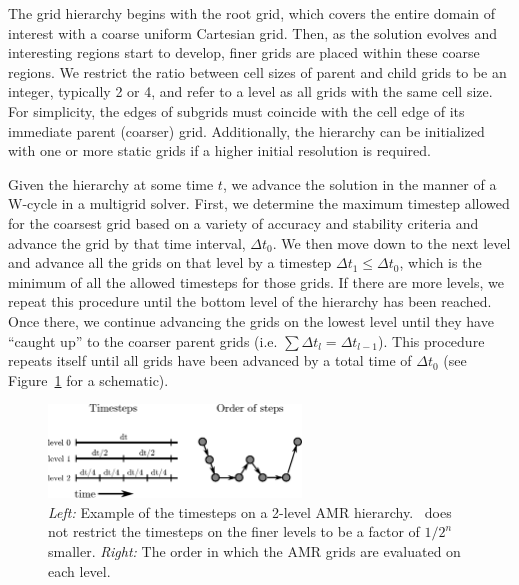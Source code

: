 The grid hierarchy begins with the root grid, which covers the entire
domain of interest with a coarse uniform Cartesian grid. Then, as
the solution evolves and interesting regions start to develop, finer grids are
placed within these coarse regions.
We restrict the ratio between cell sizes of parent and child grids to be an integer, typically 2
or 4, and refer to a level as all grids with the same cell size.  For simplicity, the edges of subgrids must
coincide with the cell edge of its immediate parent (coarser)
grid. Additionally, the hierarchy can be initialized with one or more
static grids if a higher initial resolution is required.

Given the hierarchy at some time $t$, we advance the solution in the
manner of a W-cycle in a multigrid solver.  First, we determine the
maximum timestep allowed for the coarsest grid based on a variety of
accuracy and stability criteria and advance the grid by that time
interval, $\Delta t_0$.  We then move down to the next level and
advance all the grids on that level by a timestep $\Delta t_1 \leq
\Delta t_0$, which is the minimum of all the allowed timesteps for
those grids.  If there are more levels, we repeat this procedure until
the bottom level of the hierarchy has been reached.  Once there, we
continue advancing the grids on the lowest level until they have
``caught up'' to the coarser parent grids (i.e. $\sum \Delta t_l =
\Delta t_{l-1}$).  This procedure repeats itself until all grids have
been advanced by a total time of $\Delta t_0$ (see
Figure~\ref{fig:wcycle} for a schematic).


\begin{figure}
\begin{center}
\includegraphics[width=0.6\textwidth]{figures/timestepping.eps}
\end{center}
\caption{\emph{Left:} Example of the timesteps on a 2-level AMR
  hierarchy.  \enzo\ does not restrict the timesteps on the finer levels
  to be a factor of $1/2^n$ smaller.  \emph{Right:} The order in which
  the AMR grids are evaluated on each level.\vspace{1ex}}
\label{fig:wcycle}
\end{figure}

